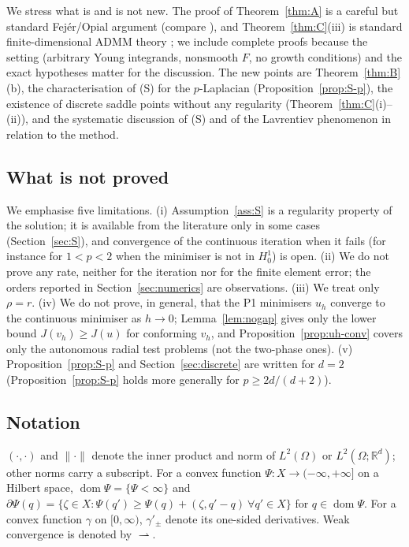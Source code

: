 \documentclass[11pt]{amsart}
\theoremstyle{definition}
\theoremstyle{remark}
\numberwithin{equation}{section}
\newcommand{\R}{\mathbb{R}}
\newcommand{\norm}[1]{\lVert #1\rVert}
\DeclareMathOperator{\dom}{dom}
\newcommand{\weak}{\rightharpoonup}
\begin{document}
We stress what is and is not new. The proof of Theorem~\ref{thm:A} is a careful but standard Fej\'er/Opial argument (compare \cite{MoradifamNachman2011,BartelsMilicevic2017}), and Theorem~\ref{thm:C}(iii) is standard finite-dimensional ADMM theory \cite{EcksteinBertsekas1992}; we include complete proofs because the setting (arbitrary Young integrands, nonsmooth $F$, no growth conditions) and the exact hypotheses matter for the discussion. The new points are Theorem~\ref{thm:B}(b), the characterisation of (S) for the $p$-Laplacian (Proposition~\ref{prop:S-p}), the existence of discrete saddle points without any regularity (Theorem~\ref{thm:C}(i)--(ii)), and the systematic discussion of (S) and of the Lavrentiev phenomenon in relation to the method.

\subsection*{What is not proved}
We emphasise five limitations. (i) Assumption~\ref{ass:S} is a regularity property of the solution; it is available from the literature only in some cases (Section~\ref{sec:S}), and convergence of the continuous iteration when it fails (for instance for $1<p<2$ when the minimiser is not in $H^1_0$) is open. (ii) We do not prove any rate, neither for the iteration nor for the finite element error; the orders reported in Section~\ref{sec:numerics} are observations. (iii) We treat only $\rho=r$. (iv) We do not prove, in general, that the P1 minimisers $u_h$ converge to the continuous minimiser as $h\to0$; Lemma~\ref{lem:nogap} gives only the lower bound $J(v_h)\ge J(u)$ for conforming $v_h$, and Proposition~\ref{prop:uh-conv} covers only the autonomous radial test problems (not the two-phase ones). (v) Proposition~\ref{prop:S-p} and Section~\ref{sec:discrete} are written for $d=2$ (Proposition~\ref{prop:S-p} holds more generally for $p\ge2d/(d+2)$).

\subsection*{Notation}
$(\cdot,\cdot)$ and $\norm\cdot$ denote the inner product and norm of $L^2(\Omega)$ or $L^2(\Omega;\R^d)$; other norms carry a subscript. For a convex function $\Psi\colon X\to(-\infty,+\infty]$ on a Hilbert space, $\dom\Psi=\{\Psi<\infty\}$ and $\partial\Psi(q)=\{\zeta\in X:\Psi(q')\ge\Psi(q)+(\zeta,q'-q)\ \forall q'\in X\}$ for $q\in\dom\Psi$. For a convex function $\gamma$ on $[0,\infty)$, $\gamma'_\pm$ denote its one-sided derivatives. Weak convergence is denoted by $\weak$.
\end{document}
